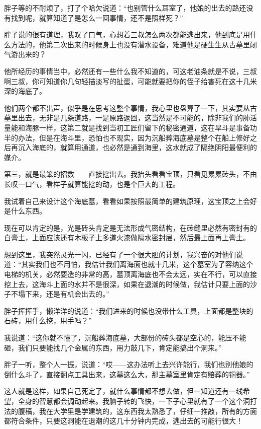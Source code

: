 胖子等的不耐烦了，打了个哈欠说道：“也别管什么耳室了，他娘的出去的路还没有找到呢，就算知道了是怎么一回事情，还不是照样死？”

胖子说的很有道理，我叹了口气，心想着三叔怎么两次都能逃出来，他到底是用什么方法的，他第二次出来的时候身上也没有潜水设备，难道他是硬生生从古墓里闭气游出来的？

他所经历的事情当中，必然还有一些什么我不知道的，可这老油条就是不说，三叔啊三叔，你可知道你几句轻描淡写的扯蛋，可能就要把你的侄子给害死在这十几米深的海底了。

他们两个都不出声，似乎是在思考这整个事情，我心里也盘算了一下，其实要从古墓里出去，无非是几条道路，一是原路返回，这当然是不可能的，除非我们的肺活量能和海豚一样，这第二就是找到当初工匠们留下的秘密通道，这在旱斗是事备功半的办法，但是在海斗里，恐怕也不现实，因为沉船葬海底墓是整个在船上修好之后再沉入海底的，就算用通道，也必然是通到海里，这水就成了隔绝阴阳最便利的媒介。

第三，就是最笨的招数——直接挖出去。我抬头看看宝顶，只看见累累砖头，不由长叹一口气，看样子就算能挖的动，也是个巨大的工程。

我试着自己来设计这个海底墓，看看如果按照最简单的建筑原理，这宝顶之上会好是什么东西。

现在可以肯定的是，光是砖头肯定是无法形成气密结构，在砖缝里必然有密封有的白膏土，上面应该还有木板子上多道火漆做隔水密封层，然后最上面再上膏土。

想到这里，我突然灵光一闪，已经有了一个很大胆的计划，我兴奋的对他们说道：“其实我们也不用怕，我估计我们离海面也就十几米，这个墓室为了容纳这个电梯的机关，必然要造的非常的高，墓顶离海底也不会太远，实在不行，可以直接挖上去，这海斗上面的水并不是很深，如果在退潮的时候做，我估计只要上面的沙子不塌下来，还是有机会出去的。”

胖子挥挥手，懒洋洋的说道：“我们进来的时候也没带什么工具，上面都是整块的石砖，用什么挖，用手吗？”

我说道：“这你就不懂了，沉船葬海底墓，大部份的砖头都是空心的，能压不能砸，我们只要能找几个金属的东西，用力敲几下，肯定能搞出个洞来。”

胖子一听，整个人一振，说道：“哎——这办法听上去兴许能行，我们也别他娘的倒什么斗了，直接翻点工具出来，这墓这么大，那主墓室里肯定有赔葬的铜器。”

这人就是这样，如果自己死定了，就什么事情都不想去做，但一知道还有一线希望，全身的智慧都会调动起来。我脑子转的飞快，一下子心里就有了一个这个洞打法的腹稿，我在大学里是学建筑的，这东西我太熟悉了，仔细一推敲，所有的方面都符合条件，只要这洞能在退潮的这几十分钟内完成，逃出去的可能行很大！

